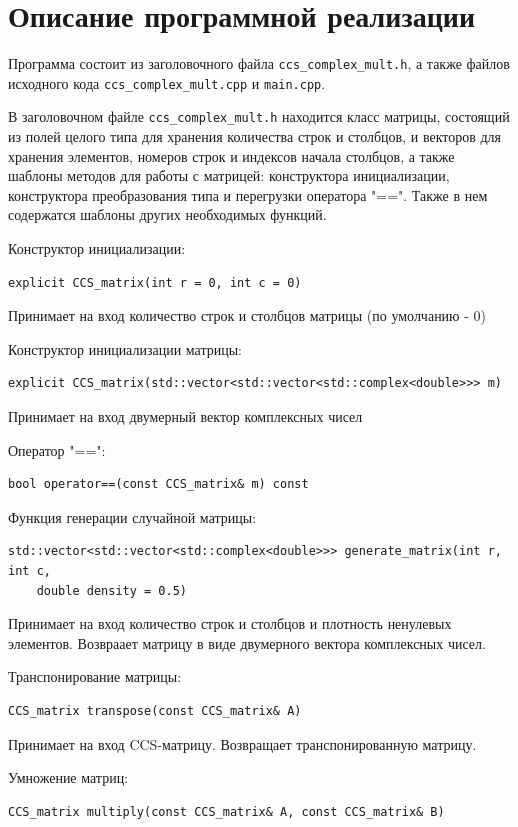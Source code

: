 \documentclass{report}
\begin{document}
\section*{Описание программной реализации}
\par Программа состоит из заголовочного файла \verb|ccs_complex_mult.h|, а также файлов исходного кода \verb|ccs_complex_mult.cpp| и \verb|main.cpp|.
\par В заголовочном файле \verb|ccs_complex_mult.h| находится класс матрицы, состоящий из полей целого типа для хранения количества строк и столбцов, и векторов для хранения элементов, номеров строк и индексов начала столбцов, а также шаблоны методов для работы с матрицей: конструктора инициализации, конструктора преобразования типа и перегрузки оператора "==". Также в нем содержатся шаблоны других необходимых функций.
\par Конструктор инициализации:
\begin{lstlisting}
explicit CCS_matrix(int r = 0, int c = 0)
\end{lstlisting}
Принимает на вход количество строк и столбцов матрицы (по умолчанию - 0)
\par Конструктор инициализации матрицы:
\begin{lstlisting}
explicit CCS_matrix(std::vector<std::vector<std::complex<double>>> m)
\end{lstlisting}
Принимает на вход двумерный вектор комплексных чисел
\par Оператор "==":
\begin{lstlisting}
bool operator==(const CCS_matrix& m) const 
\end{lstlisting}
\par Функция генерации случайной матрицы:
\begin{lstlisting}
std::vector<std::vector<std::complex<double>>> generate_matrix(int r, int c,
    double density = 0.5)
\end{lstlisting}
Принимает на вход количество строк и столбцов и плотность ненулевых элементов. Возвраает матрицу в виде двумерного вектора комплексных чисел.
\par Транспонирование матрицы:
\begin{lstlisting}    
CCS_matrix transpose(const CCS_matrix& A)
\end{lstlisting}
Принимает на вход CCS-матрицу. Возвращает транспонированную матрицу.
\par Умножение матриц:
\begin{lstlisting}
CCS_matrix multiply(const CCS_matrix& A, const CCS_matrix& B)
\end{lstlisting}
\end{document}

